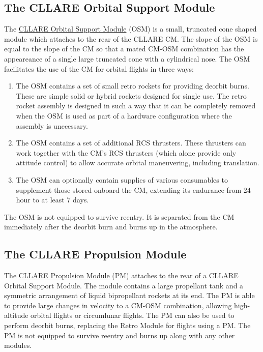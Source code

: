 \documentclass{report}
\begin{document}
\subsection{The CLLARE Orbital Support Module}

The \href{http://cstart.org/wiki/CLLARE_Orbital_Support_Module}{CLLARE Orbital Support Module} (OSM) is a small, truncated cone shaped module which attaches to the rear of the CLLARE CM.  The slope of the OSM is equal to the slope of the CM so that a mated CM-OSM combination has the appeareance of a single large truncated cone with a cylindrical nose.  The OSM facilitates the use of the CM for orbital flights in three ways:
\begin{enumerate}
\item The OSM contains a set of small retro rockets for providing deorbit burns.  These are simple solid or hybrid rockets designed for single use.  The retro rocket assembly is designed in such a way that it can be completely removed when the OSM is used as part of a hardware configuration where the assembly is unecessary.
\item The OSM contains a set of additional RCS thrusters.  These thrusters can work together with the CM's RCS thrusters (which alone provide only attitude control) to allow accurate orbital maneuvering, including translation.
\item The OSM can optionally contain supplies of various consumables to supplement those stored onboard the CM, extending its endurance from 24 hour to at least 7 days.
\end{enumerate}
The OSM is not equipped to survive reentry.  It is separated from the CM immediately after the deorbit burn and burns up in the atmosphere.

\subsection{The CLLARE Propulsion Module}

The \href{http://cstart.org/wiki/CLLARE_Propulsion_Module}{CLLARE Propulsion Module} (PM) attaches to the rear of a CLLARE Orbital Support Module.  The module contains a large propellant tank and a symmetric arrangement of liquid bipropellant rockets at its end.  The PM is able to provide large changes in velocity to a CM-OSM combination, allowing high-altitude orbital flights or circumlunar flights.  The PM can also be used to perform deorbit burns, replacing the Retro Module for flights using a PM.  The PM is not equipped to survive reentry and burns up along with any other modules.
\end{document}
